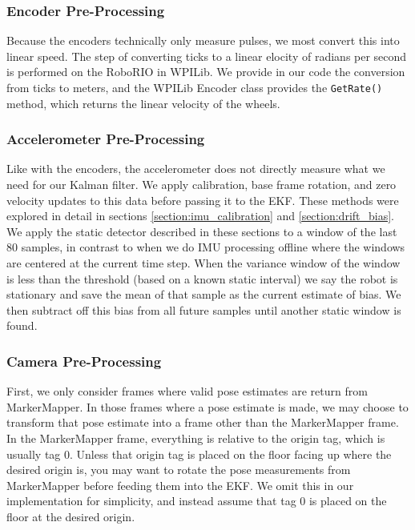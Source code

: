 \documentclass{article}
\begin{document}
    \subsubsection{Encoder Pre-Processing}

      Because the encoders technically only measure pulses, we most convert this into linear speed. The step of converting ticks to a linear elocity of radians per second is performed on the RoboRIO in WPILib. We provide in our code the conversion from ticks to meters, and the WPILib Encoder class provides the \texttt{GetRate()} method, which returns the linear velocity of the wheels.

    \subsubsection{Accelerometer Pre-Processing}

      Like with the encoders, the accelerometer does not directly measure what we need for our Kalman filter. We apply calibration, base frame rotation, and zero velocity updates to this data before passing it to the EKF. These methods were explored in detail in sections \ref{section:imu_calibration} and \ref{section:drift_bias}. We apply the static detector described in these sections to a window of the last $80$ samples, in contrast to when we do IMU processing offline where the windows are centered at the current time step. When the variance window of the window is less than the threshold (based on a known static interval) we say the robot is stationary and save the mean of that sample as the current estimate of bias. We then subtract off this bias from all future samples until another static window is found.

    \subsubsection{Camera Pre-Processing}

      First, we only consider frames where valid pose estimates are return from MarkerMapper. In those frames where a pose estimate is made, we may choose to transform that pose estimate into a frame other than the MarkerMapper frame. In the MarkerMapper frame, everything is relative to the origin tag, which is usually tag 0. Unless that origin tag is placed on the floor facing up where the desired origin is, you may want to rotate the pose measurements from MarkerMapper before feeding them into the EKF. We omit this in our implementation for simplicity, and instead assume that tag 0 is placed on the floor at the desired origin.
\end{document}
